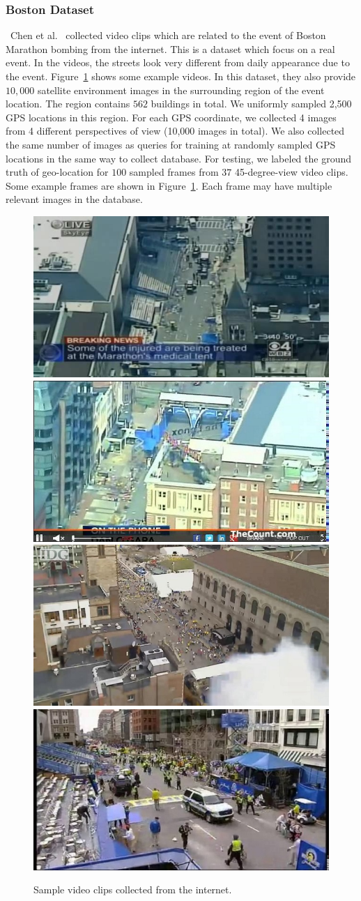 \subsubsection{Boston Dataset} 
~Chen et al.~\cite{chen2016boston} collected video clips which are related to the event of Boston Marathon bombing from the internet. 
This is a dataset which focus on a real event. 
In the videos, the streets look very different from daily appearance due to the event.
Figure~\ref{fig:bostonvideo} shows some example videos. 
In this dataset, they also provide $10,000$ satellite environment images in the surrounding region of the event location. 
The region contains $562$ buildings in total. 
We uniformly sampled 2,500 GPS locations in this region. 
For each GPS coordinate, we collected 4 images from 4 different perspectives of view (10,000 images in total).
We also collected the same number of images as queries for training at randomly sampled GPS locations in the same way to collect database.
For testing, we labeled the ground truth of geo-location for $100$ sampled frames from $37$ 45-degree-view video clips. Some example frames are shown in Figure~\ref{fig:bostonvideo}. Each frame may have multiple relevant images in the database.
\begin{figure}[htbp]
\includegraphics[width=0.4\linewidth]{img/video_1}
\includegraphics[width=0.4\linewidth]{img/video_2}
\\[0.1cm]
\includegraphics[width=0.4\linewidth]{img/video_3}
\includegraphics[width=0.4\linewidth]{img/video_4}
\caption{Sample video clips collected from the internet.}
\label{fig:bostonvideo}
\end{figure}



